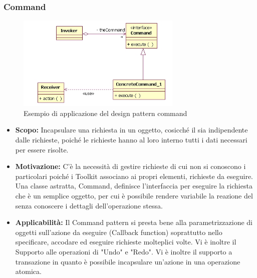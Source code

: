 \documentclass{scalatekids-article}
\begin{document}
\subsubsection{Command}
\begin{figure}[H]
  \begin{center}
    \includegraphics[width=0.7\textwidth, keepaspectratio]{img/designPattern/CommandPattern.png}
    \caption{Esempio di applicazione del design pattern command}
  \end{center}
\end{figure}
\begin{itemize}
\item \textbf{Scopo:} Incapsulare una richiesta in un oggetto, cosicché il  sia indipendente dalle richieste, poiché le richieste hanno al loro interno tutti i dati necessari per essere risolte.
\item \textbf{Motivazione:} C'è la necessità di gestire richieste di cui non si conoscono i particolari poiché i Toolkit associano ai propri elementi, richieste da eseguire.
  Una classe astratta, Command, definisce l’interfaccia per eseguire la richiesta che è un semplice oggetto, per cui è possibile rendere variabile la reazione del  senza conoscere i dettagli dell'operazione stessa.
\item \textbf{Applicabilità:} Il Command pattern si presta bene alla parametrizzazione di oggetti sull’azione da eseguire (Callback function) soprattutto nello specificare, accodare ed eseguire richieste molteplici volte. Vi è inoltre il Supporto alle operazioni di "Undo" e "Redo". Vi è inoltre il supporto a transazione in quanto è possibile incapsulare un'azione in una operazione atomica.
\end{itemize}
\end{document}
